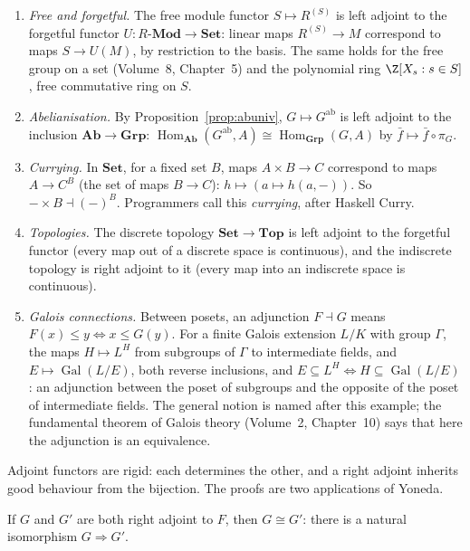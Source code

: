 \begin{example}\label{ex:adjunctions}
\leavevmode
\begin{enumerate}[label=(\alph*)]
\item \emph{Free and forgetful.} The free module functor $S\mapsto R^{(S)}$ is left adjoint to the forgetful functor $U\colon R\text{-}\mathbf{Mod}\to\mathbf{Set}$: linear maps $R^{(S)}\to M$ correspond to maps $S\to U(M)$, by restriction to the
basis. The same holds for the free group on a set (Volume~8, Chapter~5) and the polynomial ring $\Z[X_s:s\in S]$, free commutative ring on $S$.
\item \emph{Abelianisation.} By Proposition~\ref{prop:abuniv}, $G\mapsto G^{\mathrm{ab}}$ is left adjoint to the inclusion $\mathbf{Ab}\to\mathbf{Grp}$: $\operatorname{Hom}_{\mathbf{Ab}}(G^{\mathrm{ab}},A)\cong\operatorname{Hom}_{\mathbf{Grp}}(G,A)$ by $\bar f\mapsto\bar f\circ\pi_G$.
\item \emph{Currying.} In $\mathbf{Set}$, for a fixed set $B$, maps $A\times B\to C$ correspond to maps $A\to C^B$ (the set of maps $B\to C$): $h\mapsto(a\mapsto h(a,-))$. So $-\times B\dashv(-)^B$. Programmers call this
\emph{currying}, after Haskell Curry.
\item \emph{Topologies.} The discrete topology $\mathbf{Set}\to\mathbf{Top}$ is left adjoint to the forgetful functor (every map out of a discrete space is continuous), and the indiscrete topology is right adjoint to it (every
map into an indiscrete space is continuous).
\item \emph{Galois connections.} Between posets, an adjunction $F\dashv G$ means $F(x)\le y\iff x\le G(y)$. For a finite Galois extension $L/K$ with group $\Gamma$, the maps $H\mapsto L^H$ from subgroups of $\Gamma$ to
intermediate fields, and $E\mapsto\operatorname{Gal}(L/E)$, both reverse inclusions, and $E\subseteq L^H\iff H\subseteq\operatorname{Gal}(L/E)$: an adjunction between the poset of subgroups and the opposite of the poset of
intermediate fields. The general notion is named after this example; the fundamental theorem of Galois theory (Volume~2, Chapter~10) says that here the adjunction is an equivalence.
\end{enumerate}
\end{example}

Adjoint functors are rigid: each determines the other, and a right adjoint inherits good behaviour from the bijection. The proofs are two applications of Yoneda.

\begin{theorem}\label{thm:adjunique}
If $G$ and $G'$ are both right adjoint to $F$, then $G\cong G'$: there is a natural isomorphism $G\Rightarrow G'$.
\end{theorem}

